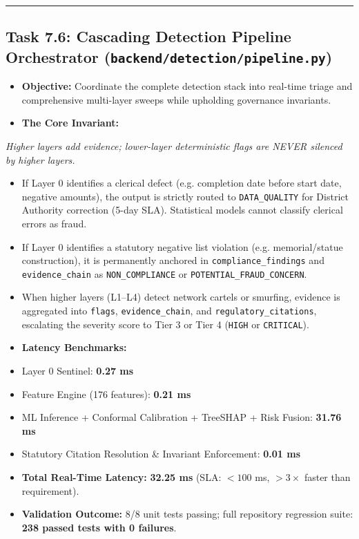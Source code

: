 \documentclass[11pt,a4paper]{article}
\begin{document}
\vspace{1em}\hrule\vspace{1em}

\subsection{Task 7.6: Cascading Detection Pipeline Orchestrator (\texttt{backend/detection/pipeline.py})}
\begin{itemize}[leftmargin=1.5em, itemsep=2pt, topsep=3pt]
\item \textbf{Objective:} Coordinate the complete detection stack into real-time triage and comprehensive multi-layer sweeps while upholding governance invariants.
\item \textbf{The Core Invariant:}
\end{itemize}
\begin{tcolorbox}[colback=blue!4!white,colframe=blue!60!black,arc=1.5mm,boxrule=0.7pt,left=8pt,right=8pt,top=6pt,bottom=6pt]
\textit{Higher layers add evidence; lower-layer deterministic flags are NEVER silenced by higher layers.}\\
\end{tcolorbox}
\begin{itemize}[leftmargin=1.5em, itemsep=2pt, topsep=3pt]
\item If Layer 0 identifies a clerical defect (e.g. completion date before start date, negative amounts), the output is strictly routed to \texttt{DATA\_QUALITY} for District Authority correction (5-day SLA). Statistical models cannot classify clerical errors as fraud.
\item If Layer 0 identifies a statutory negative list violation (e.g. memorial/statue construction), it is permanently anchored in \texttt{compliance\_findings} and \texttt{evidence\_chain} as \texttt{NON\_COMPLIANCE} or \texttt{POTENTIAL\_FRAUD\_CONCERN}.
\item When higher layers (L1–L4) detect network cartels or smurfing, evidence is aggregated into \texttt{flags}, \texttt{evidence\_chain}, and \texttt{regulatory\_citations}, escalating the severity score to Tier 3 or Tier 4 (\texttt{HIGH} or \texttt{CRITICAL}).
\item \textbf{Latency Benchmarks:}
\item Layer 0 Sentinel: \textbf{0.27 ms}
\item Feature Engine (176 features): \textbf{0.21 ms}
\item ML Inference + Conformal Calibration + TreeSHAP + Risk Fusion: \textbf{31.76 ms}
\item Statutory Citation Resolution \& Invariant Enforcement: \textbf{0.01 ms}
\item \textbf{Total Real-Time Latency:} \textbf{32.25 ms} (SLA: $< 100$ ms, $> 3\times$ faster than requirement).
\item \textbf{Validation Outcome:} 8/8 unit tests passing; full repository regression suite: \textbf{238 passed tests with 0 failures}.
\end{itemize}
\end{document}
